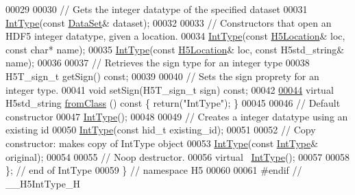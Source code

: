 \begin{DoxyCode}
00029 
00030         \textcolor{comment}{// Gets the integer datatype of the specified dataset}
00031         \hyperlink{class_h5_1_1_int_type}{IntType}(\textcolor{keyword}{const} \hyperlink{class_h5_1_1_data_set}{DataSet}& dataset);
00032 
00033         \textcolor{comment}{// Constructors that open an HDF5 integer datatype, given a location.}
00034         \hyperlink{class_h5_1_1_int_type}{IntType}(\textcolor{keyword}{const} \hyperlink{class_h5_1_1_h5_location}{H5Location}& loc, \textcolor{keyword}{const} \textcolor{keywordtype}{char}* name);
00035         \hyperlink{class_h5_1_1_int_type}{IntType}(\textcolor{keyword}{const} \hyperlink{class_h5_1_1_h5_location}{H5Location}& loc, \textcolor{keyword}{const} H5std\_string& name);
00036 
00037         \textcolor{comment}{// Retrieves the sign type for an integer type}
00038         H5T\_sign\_t getSign() \textcolor{keyword}{const};
00039 
00040         \textcolor{comment}{// Sets the sign proprety for an integer type.}
00041         \textcolor{keywordtype}{void} setSign(H5T\_sign\_t sign) \textcolor{keyword}{const};
00042 
\hyperlink{class_h5_1_1_int_type_a8e4d3767868034eeb45d362cd6201adc}{00044}         \textcolor{keyword}{virtual} H5std\_string \hyperlink{class_h5_1_1_int_type_a8e4d3767868034eeb45d362cd6201adc}{fromClass} ()\textcolor{keyword}{ const }\{ \textcolor{keywordflow}{return}(\textcolor{stringliteral}{"IntType"}); \}
00045 
00046         \textcolor{comment}{// Default constructor}
00047         \hyperlink{class_h5_1_1_int_type}{IntType}();
00048 
00049         \textcolor{comment}{// Creates a integer datatype using an existing id}
00050         \hyperlink{class_h5_1_1_int_type}{IntType}(\textcolor{keyword}{const} hid\_t existing\_id);
00051 
00052         \textcolor{comment}{// Copy constructor: makes copy of IntType object}
00053         \hyperlink{class_h5_1_1_int_type}{IntType}(\textcolor{keyword}{const} \hyperlink{class_h5_1_1_int_type}{IntType}& original);
00054 
00055         \textcolor{comment}{// Noop destructor.}
00056         \textcolor{keyword}{virtual} ~\hyperlink{class_h5_1_1_int_type}{IntType}();
00057 
00058 \}; \textcolor{comment}{// end of IntType}
00059 \} \textcolor{comment}{// namespace H5}
00060 
00061 \textcolor{preprocessor}{#endif // \_\_H5IntType\_H}
\end{DoxyCode}
